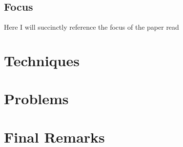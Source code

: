 \documentclass{Paper_Summary}
\begin{document}
\makepapertitle

\breakline

\begin{center}
    \section*{Focus}
    Here I will succinctly reference the focus of the paper read
\end{center}

\breakline

\newpage

\section{Techniques}


\section{Problems}


\section{Final Remarks}
\end{document}
